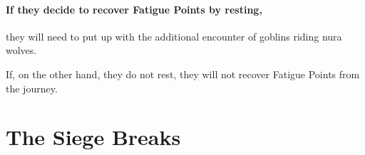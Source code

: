 \begin{multicols}{2}
\paragraph{If they decide to recover Fatigue Points by resting,}
they will need to put up with the additional encounter of goblins riding nura wolves.



If, on the other hand, they do not rest, they will not recover Fatigue Points from the journey.

\end{multicols}

\section{The Siege Breaks}

